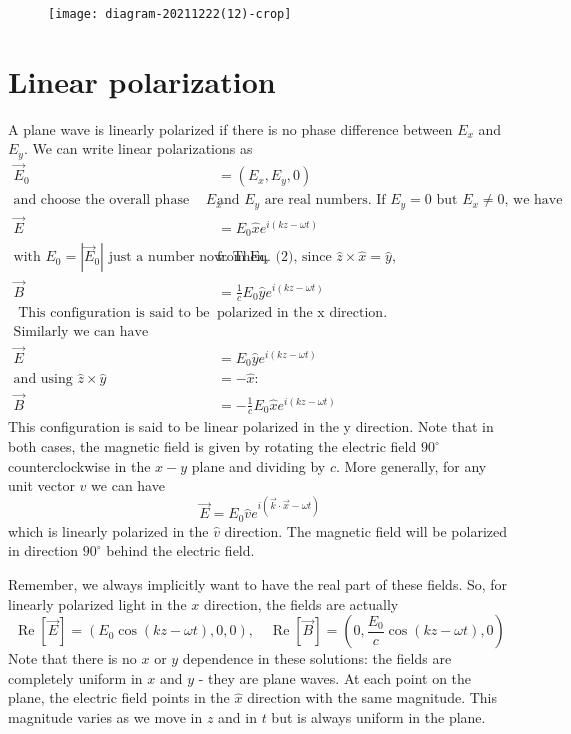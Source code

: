 \begin{figure}[H]
 	\centering
 	\texttt{[image: diagram-20211222(12)-crop]}
 	\caption{}
 	\label{}
 \end{figure}
 
 \section{Linear polarization}
  A plane wave is linearly polarized if there is no phase difference between $E_{x}$ and $E_{y}$. We can write linear polarizations as
  \begin{align*}
  \vec{E}_{0}&=\left(E_{x}, E_{y}, 0\right)\\
  \text{and choose the overall phase so that $E_{x}$ }&\text{and $E_{y}$ are real numbers. If $E_{y}=0$ but $E_{x} \neq 0$, we have}\\
  \vec{E}&=E_{0} \hat{x} e^{i(k z-\omega t)}\\
  \text{with }E_{0}=\left|\vec{E}_{0}\right|\text{ just a number now. Then, }&\text{from Eq. (2), since $\hat{z} \times \hat{x}=\hat{y}$,}\\
  \vec{B}&=\frac{1}{c} E_{0} \hat{y} e^{i(k z-\omega t)}\\
\text{  This configuration is said to be linear }&\text{polarized in the $\mathrm{x}$ direction.}\\
  \text{Similarly we can have}\\
  \vec{E}&=E_{0} \hat{y} e^{i(k z-\omega t)}\\
  \text{and using }\hat{z} \times \hat{y}&=-\hat{x} :\\
  \vec{B}&=-\frac{1}{c} E_{0} \hat{x} e^{i(k z-\omega t)}
  \end{align*}
 This configuration is said to be linear polarized in the y direction. Note that in both cases, the magnetic field is given by rotating the electric field $90^{\circ}$ counterclockwise in the $x-y$ plane and dividing by $c$.
 More generally, for any unit vector $\hat{v}$ we can have
 $$
 \vec{E}=E_{0} \hat{v} e^{i(\vec{k} \cdot \vec{x}-\omega t)}
 $$
 which is linearly polarized in the $\hat{v}$ direction. The magnetic field will be polarized in direction $90^{\circ}$ behind the electric field.
 
 Remember, we always implicitly want to have the real part of these fields. So, for linearly polarized light in the $x$ direction, the fields are actually
 $$
 \operatorname{Re}[\vec{E}]=\left(E_{0} \cos (k z-\omega t), 0,0\right), \quad \operatorname{Re}[\vec{B}]=\left(0, \frac{E_{0}}{c} \cos (k z-\omega t), 0\right)
 $$
 Note that there is no $x$ or $y$ dependence in these solutions: the fields are completely uniform in $x$ and $y$ - they are plane waves. At each point on the plane, the electric field points in the $\hat{x}$ direction with the same magnitude. This magnitude varies as we move in $z$ and in $t$ but is always uniform in the plane.
